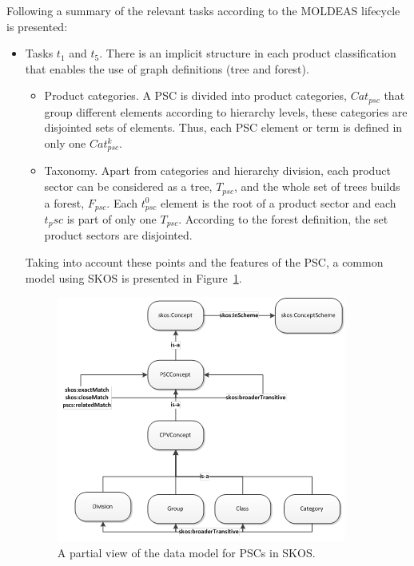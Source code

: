 Following a summary of the relevant tasks according to the MOLDEAS lifecycle is presented:
\begin{itemize}
 \item Tasks $t_1$ and $t_5$. There is an implicit structure in each product classification 
 that enables the use of graph definitions (tree and forest).
 \begin{itemize}
  \item Product categories. A PSC is divided into product categories, $Cat_{psc}$ 
  that group different elements according to hierarchy levels, these categories are disjointed sets of elements. 
  Thus, each PSC element or term is defined in only one $Cat^k_{psc}$.
  \item Taxonomy. Apart from categories and hierarchy division, each product sector can be considered as a tree, $T_{psc}$, 
  and the whole set of trees builds a forest, $F_{psc}$. Each $t^0_{psc}$  element 
  is the root of a product sector and each $t_psc$ is part of only one $T_{psc}$. According to the forest definition, 
  the set product sectors are disjointed.
 \end{itemize}

 Taking into account these points and the features of the PSC, a common model using SKOS is presented in Figure~\ref{fig:pscs-data-model}.
 
 \begin{figure}[!ht]
\centering
	\includegraphics[width=\textwidth]{./imgs/fig-2}
 \caption{A partial view of the data model for PSCs in SKOS.}
 \label{fig:pscs-data-model}
\end{figure}


\end{itemize}
